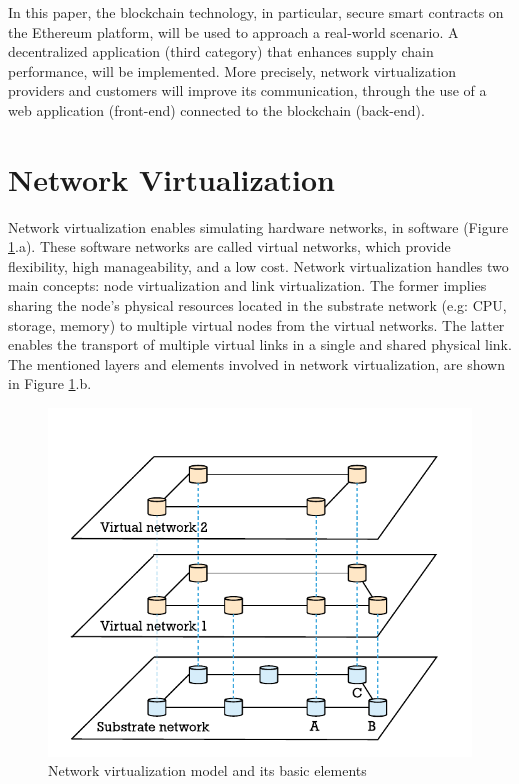 In this paper, the blockchain technology, in particular, secure smart contracts on the Ethereum platform, will be used to approach a real-world scenario. A decentralized application (third category) that enhances supply chain performance, will be implemented. More precisely, network virtualization providers and customers will improve its communication, through the use of a web application (front-end) connected to the blockchain (back-end).


\section{Network Virtualization}

Network virtualization enables simulating hardware networks, in software (Figure \ref{fig:networkvir}.a). These software networks are called virtual networks, which provide flexibility, high manageability, and a low cost. Network virtualization handles two main concepts: node virtualization and link virtualization. The former implies sharing the node's physical resources located in the substrate network (e.g: CPU, storage, memory) to multiple virtual nodes from the virtual networks. The latter enables the transport of multiple virtual links in a single and shared physical link. The mentioned layers and elements involved in network virtualization, are shown in Figure \ref{fig:networkvir}.b.


\begin{figure}[bth]
  \includegraphics[width=1\linewidth]{gfx/networkvir}    
  \caption{Network virtualization model and its basic elements \citep{carapinha2009network}}
  \label{fig:networkvir}
\end{figure}

